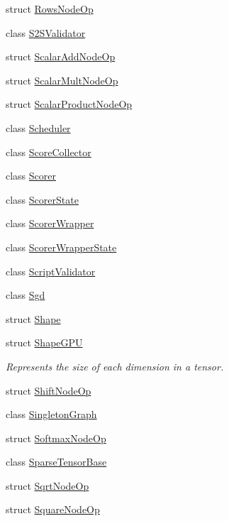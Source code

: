 \begin{DoxyCompactItemize}
\item 
struct \hyperlink{structmarian_1_1RowsNodeOp}{Rows\+Node\+Op}
\item 
class \hyperlink{classmarian_1_1S2SValidator}{S2\+S\+Validator}
\item 
struct \hyperlink{structmarian_1_1ScalarAddNodeOp}{Scalar\+Add\+Node\+Op}
\item 
struct \hyperlink{structmarian_1_1ScalarMultNodeOp}{Scalar\+Mult\+Node\+Op}
\item 
struct \hyperlink{structmarian_1_1ScalarProductNodeOp}{Scalar\+Product\+Node\+Op}
\item 
class \hyperlink{classmarian_1_1Scheduler}{Scheduler}
\item 
class \hyperlink{classmarian_1_1ScoreCollector}{Score\+Collector}
\item 
class \hyperlink{classmarian_1_1Scorer}{Scorer}
\item 
class \hyperlink{classmarian_1_1ScorerState}{Scorer\+State}
\item 
class \hyperlink{classmarian_1_1ScorerWrapper}{Scorer\+Wrapper}
\item 
class \hyperlink{classmarian_1_1ScorerWrapperState}{Scorer\+Wrapper\+State}
\item 
class \hyperlink{classmarian_1_1ScriptValidator}{Script\+Validator}
\item 
class \hyperlink{classmarian_1_1Sgd}{Sgd}
\item 
struct \hyperlink{structmarian_1_1Shape}{Shape}
\item 
struct \hyperlink{structmarian_1_1ShapeGPU}{Shape\+G\+PU}
\begin{DoxyCompactList}\small\item\em Represents the size of each dimension in a tensor. \end{DoxyCompactList}\item 
struct \hyperlink{structmarian_1_1ShiftNodeOp}{Shift\+Node\+Op}
\item 
class \hyperlink{classmarian_1_1SingletonGraph}{Singleton\+Graph}
\item 
struct \hyperlink{structmarian_1_1SoftmaxNodeOp}{Softmax\+Node\+Op}
\item 
class \hyperlink{classmarian_1_1SparseTensorBase}{Sparse\+Tensor\+Base}
\item 
struct \hyperlink{structmarian_1_1SqrtNodeOp}{Sqrt\+Node\+Op}
\item 
struct \hyperlink{structmarian_1_1SquareNodeOp}{Square\+Node\+Op}
\item 

\end{DoxyCompactItemize}
